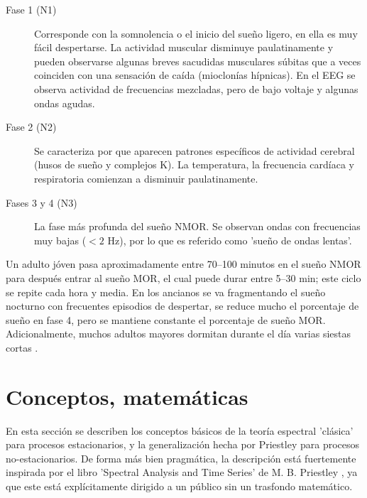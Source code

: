 \documentclass[12pt,a4paper]{mitthesis}
\begin{document}
\begin{description}
\item[Fase 1 (N1)] Corresponde con la somnolencia o el inicio del sue\~no ligero, en ella es muy 
f\'acil despertarse. La actividad muscular disminuye paulatinamente y pueden observarse algunas 
breves sacudidas musculares s\'ubitas que a veces coinciden con una sensación de ca\'ida 
(mioclon\'ias h\'ipnicas). En el EEG se observa actividad de frecuencias mezcladas, pero de bajo 
voltaje y algunas ondas agudas. 

\item[Fase 2 (N2)] Se caracteriza por que aparecen patrones espec\'ificos de actividad 
cerebral (husos de sue\~no y complejos K). La temperatura, la frecuencia card\'iaca y respiratoria 
comienzan a disminuir paulatinamente. 

\item[Fases 3 y 4 (N3)] La fase m\'as profunda del sue\~no NMOR. Se observan ondas con frecuencias 
muy bajas ($<2$ Hz), por lo que es referido como 'sue\~no de ondas lentas'.
\end{description}

Un adulto j\'oven pasa aproximadamente entre 70--100 minutos en el sue\~no NMOR para despu\'es 
entrar al sue\~no MOR, el cual puede durar entre 5--30 min; este ciclo se repite cada hora y media.
En los ancianos se va fragmentando el sue\~no nocturno con frecuentes episodios de despertar, se 
reduce mucho el porcentaje de sue\~no en fase 4, pero se mantiene constante el porcentaje de 
sue\~no MOR. Adicionalmente, muchos adultos mayores dormitan durante el d\'ia varias siestas 
cortas \cite{CarrilloMora}.


\section{Conceptos, matem\'aticas}

En esta secci\'on se describen los conceptos b\'asicos de la teor\'ia espectral 'cl\'asica' para 
procesos estacionarios, y la generalizaci\'on hecha por Priestley para procesos no-estacionarios. 
De forma m\'as bien pragm\'atica, la descripci\'on est\'a
 fuertemente inspirada por el libro 'Spectral Analysis and Time Series' 
de M. B. Priestley \cite{Priestley81}, ya que este est\'a expl\'icitamente dirigido a un p\'ublico 
sin un trasfondo matem\'atico.
\end{document}
